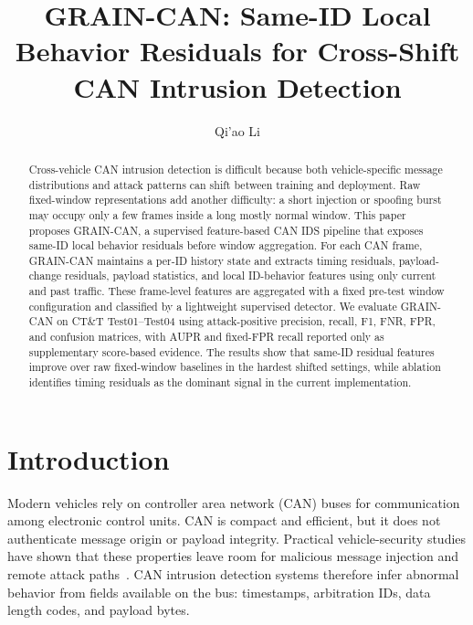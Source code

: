\documentclass[runningheads]{llncs}
\newcommand{\method}{GRAIN-CAN}
\begin{document}
\raggedbottom

\title{\method{}: Same-ID Local Behavior Residuals for Cross-Shift CAN Intrusion Detection}
\titlerunning{\method{}}
\author{Qi'ao Li}
\maketitle

\begin{abstract}
Cross-vehicle CAN intrusion detection is difficult because both vehicle-specific message distributions and attack patterns can shift between training and deployment. Raw fixed-window representations add another difficulty: a short injection or spoofing burst may occupy only a few frames inside a long mostly normal window. This paper proposes \method{}, a supervised feature-based CAN IDS pipeline that exposes same-ID local behavior residuals before window aggregation. For each CAN frame, \method{} maintains a per-ID history state and extracts timing residuals, payload-change residuals, payload statistics, and local ID-behavior features using only current and past traffic. These frame-level features are aggregated with a fixed pre-test window configuration and classified by a lightweight supervised detector. We evaluate \method{} on CT\&T Test01--Test04 using attack-positive precision, recall, F1, FNR, FPR, and confusion matrices, with AUPR and fixed-FPR recall reported only as supplementary score-based evidence. The results show that same-ID residual features improve over raw fixed-window baselines in the hardest shifted settings, while ablation identifies timing residuals as the dominant signal in the current implementation.
\end{abstract}

\section{Introduction}
Modern vehicles rely on controller area network (CAN) buses for communication among electronic control units. CAN is compact and efficient, but it does not authenticate message origin or payload integrity. Practical vehicle-security studies have shown that these properties leave room for malicious message injection and remote attack paths~\cite{koscher2010,checkoway2011,miller2015}. CAN intrusion detection systems therefore infer abnormal behavior from fields available on the bus: timestamps, arbitration IDs, data length codes, and payload bytes.
\end{document}
